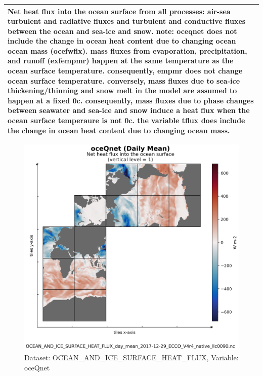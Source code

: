 \begin{longtable}{|m{}|m{}|m{}|m{}|}
\multicolumn{4}{|p{1\textwidth}|}{\footnotesize{{Net heat flux into the ocean surface from all processes: air-sea turbulent and radiative fluxes and turbulent and conductive fluxes between the ocean and sea-ice and snow. note: oceqnet does not include the change in ocean heat content due to changing ocean ocean mass (ocefwflx). mass fluxes from evaporation, precipitation, and runoff (exfempmr) happen at the same temperature as the ocean surface temperature. consequently, empmr does not change ocean surface temperature. conversely, mass fluxes due to sea-ice thickening/thinning and snow melt in the model are assumed to happen at a fixed 0c. consequently, mass fluxes due to phase changes between seawater and sea-ice and snow induce a heat flux when the ocean surface temperaure is not 0c. the variable tflux does include the change in ocean heat content due to changing ocean mass.}}} \\ \hline
\end{longtable}

\begin{figure}[H]
\centering
\includegraphics[scale=0.55]{../images/plots/native_plots/Ocean_and_Sea-Ice_Surface_Heat_Fluxes/oceQnet.png}
\caption{Dataset: OCEAN\_AND\_ICE\_SURFACE\_HEAT\_FLUX, Variable: oceQnet}
\label{tab:table-OCEAN_AND_ICE_SURFACE_HEAT_FLUX_oceQnet-Plot}
\end{figure}
\newpage
\pagebreak
